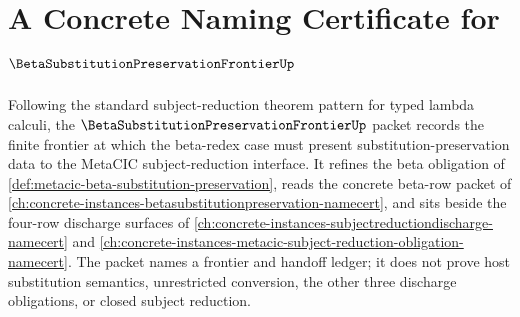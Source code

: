 \chapter{A Concrete Naming Certificate for $\BetaSubstitutionPreservationFrontierUp$}
\label{ch:concrete-instances-beta-substitution-preservation-frontier-namecert}

Following the standard subject-reduction theorem pattern for typed lambda calculi, the $\BetaSubstitutionPreservationFrontierUp$ packet records the finite frontier at which the beta-redex case must present substitution-preservation data to the MetaCIC subject-reduction interface. It refines the beta obligation of \autoref{def:metacic-beta-substitution-preservation}, reads the concrete beta-row packet of \autoref{ch:concrete-instances-betasubstitutionpreservation-namecert}, and sits beside the four-row discharge surfaces of \autoref{ch:concrete-instances-subjectreductiondischarge-namecert} and \autoref{ch:concrete-instances-metacic-subject-reduction-obligation-namecert}. The packet names a frontier and handoff ledger; it does not prove host substitution semantics, unrestricted conversion, the other three discharge obligations, or closed subject reduction.

